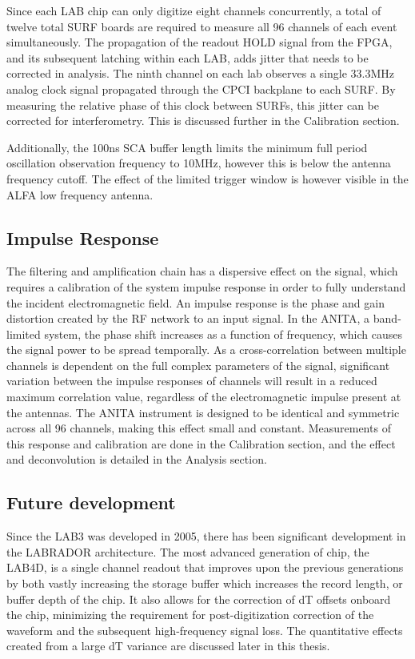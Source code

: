  	Since each LAB chip can only digitize eight channels concurrently, a total of twelve total SURF boards are required to measure all 96 channels of each event simultaneously.  The propagation of the readout HOLD signal from the FPGA, and its subsequent latching within each LAB, adds jitter that needs to be corrected in analysis.  The ninth channel on each lab observes a single 33.3MHz analog clock signal propagated through the CPCI backplane to each SURF.  By measuring the relative phase of this clock between SURFs, this jitter can be corrected for interferometry.  This is discussed further in the Calibration section.
 	
 	 Additionally, the 100ns SCA buffer length  limits the minimum full period oscillation observation frequency to 10MHz, however this is below the antenna frequency cutoff.  The effect of the limited trigger window is however visible in the ALFA low frequency antenna.
	
	\subsection{Impulse Response}
	The filtering and amplification chain has a dispersive effect on the signal, which requires a calibration of the system impulse response in order to fully understand the incident electromagnetic field.  An impulse response is the phase and gain distortion created by the RF network to an input signal.  In the ANITA, a band-limited system, the phase shift increases as a function of frequency, which causes the signal power to be spread temporally.  As a cross-correlation between multiple channels is dependent on the full complex parameters of the signal, significant variation between the impulse responses of channels will result in a reduced maximum correlation value, regardless of the electromagnetic impulse present at the antennas.  The ANITA instrument is designed to be identical and symmetric across all 96 channels, making this effect small and constant.  Measurements of this response and calibration are done in the Calibration section, and the effect and deconvolution is detailed in the Analysis section.

	
	\subsection{Future development}
	Since the LAB3 was developed in 2005, there has been significant development in the LABRADOR architecture.  The most advanced generation of chip, the LAB4D, is a single channel readout that improves upon the previous generations by both vastly increasing the storage buffer which increases the record length, or buffer depth of the chip.  It also allows for the correction of dT offsets onboard the chip, minimizing the requirement for post-digitization correction of the waveform and the subsequent high-frequency signal loss.  The quantitative effects created from a large dT variance are discussed later in this thesis.
	
